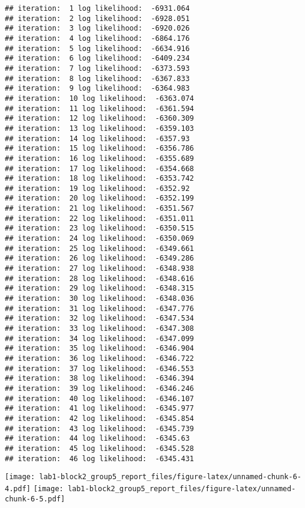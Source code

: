 \documentclass[]{article}
\begin{document}
\begin{verbatim}
## iteration:  1 log likelihood:  -6931.064 
## iteration:  2 log likelihood:  -6928.051 
## iteration:  3 log likelihood:  -6920.026 
## iteration:  4 log likelihood:  -6864.176 
## iteration:  5 log likelihood:  -6634.916 
## iteration:  6 log likelihood:  -6409.234 
## iteration:  7 log likelihood:  -6373.593 
## iteration:  8 log likelihood:  -6367.833 
## iteration:  9 log likelihood:  -6364.983 
## iteration:  10 log likelihood:  -6363.074 
## iteration:  11 log likelihood:  -6361.594 
## iteration:  12 log likelihood:  -6360.309 
## iteration:  13 log likelihood:  -6359.103 
## iteration:  14 log likelihood:  -6357.93 
## iteration:  15 log likelihood:  -6356.786 
## iteration:  16 log likelihood:  -6355.689 
## iteration:  17 log likelihood:  -6354.668 
## iteration:  18 log likelihood:  -6353.742 
## iteration:  19 log likelihood:  -6352.92 
## iteration:  20 log likelihood:  -6352.199 
## iteration:  21 log likelihood:  -6351.567 
## iteration:  22 log likelihood:  -6351.011 
## iteration:  23 log likelihood:  -6350.515 
## iteration:  24 log likelihood:  -6350.069 
## iteration:  25 log likelihood:  -6349.661 
## iteration:  26 log likelihood:  -6349.286 
## iteration:  27 log likelihood:  -6348.938 
## iteration:  28 log likelihood:  -6348.616 
## iteration:  29 log likelihood:  -6348.315 
## iteration:  30 log likelihood:  -6348.036 
## iteration:  31 log likelihood:  -6347.776 
## iteration:  32 log likelihood:  -6347.534 
## iteration:  33 log likelihood:  -6347.308 
## iteration:  34 log likelihood:  -6347.099 
## iteration:  35 log likelihood:  -6346.904 
## iteration:  36 log likelihood:  -6346.722 
## iteration:  37 log likelihood:  -6346.553 
## iteration:  38 log likelihood:  -6346.394 
## iteration:  39 log likelihood:  -6346.246 
## iteration:  40 log likelihood:  -6346.107 
## iteration:  41 log likelihood:  -6345.977 
## iteration:  42 log likelihood:  -6345.854 
## iteration:  43 log likelihood:  -6345.739 
## iteration:  44 log likelihood:  -6345.63 
## iteration:  45 log likelihood:  -6345.528 
## iteration:  46 log likelihood:  -6345.431
\end{verbatim}

\texttt{[image: lab1-block2\_group5\_report\_files/figure-latex/unnamed-chunk-6-4.pdf]}
\texttt{[image: lab1-block2\_group5\_report\_files/figure-latex/unnamed-chunk-6-5.pdf]}
\end{document}
